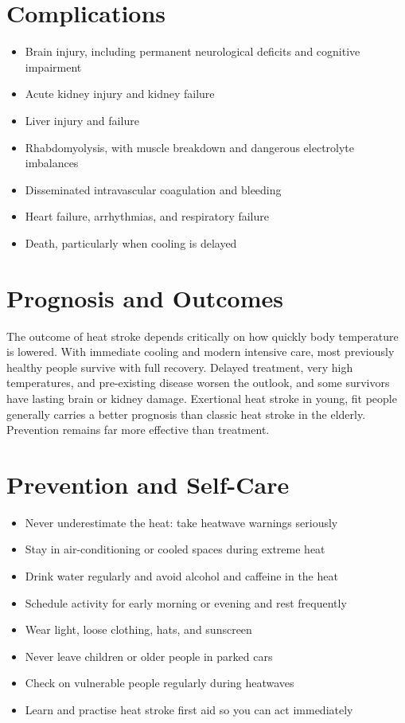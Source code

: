 \section*{Complications}
\begin{itemize}
    \item Brain injury, including permanent neurological deficits and cognitive impairment
    \item Acute kidney injury and kidney failure
    \item Liver injury and failure
    \item Rhabdomyolysis, with muscle breakdown and dangerous electrolyte imbalances
    \item Disseminated intravascular coagulation and bleeding
    \item Heart failure, arrhythmias, and respiratory failure
    \item Death, particularly when cooling is delayed
\end{itemize}

\section*{Prognosis and Outcomes}
The outcome of heat stroke depends critically on how quickly body temperature is lowered. With immediate cooling and modern intensive care, most previously healthy people survive with full recovery. Delayed treatment, very high temperatures, and pre-existing disease worsen the outlook, and some survivors have lasting brain or kidney damage. Exertional heat stroke in young, fit people generally carries a better prognosis than classic heat stroke in the elderly. Prevention remains far more effective than treatment.

\section*{Prevention and Self-Care}
\begin{itemize}
    \item Never underestimate the heat: take heatwave warnings seriously
    \item Stay in air-conditioning or cooled spaces during extreme heat
    \item Drink water regularly and avoid alcohol and caffeine in the heat
    \item Schedule activity for early morning or evening and rest frequently
    \item Wear light, loose clothing, hats, and sunscreen
    \item Never leave children or older people in parked cars
    \item Check on vulnerable people regularly during heatwaves
    \item Learn and practise heat stroke first aid so you can act immediately
\end{itemize}

